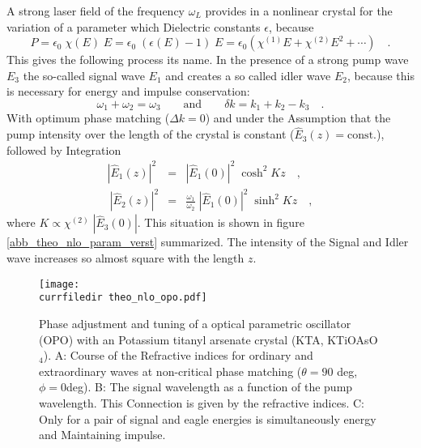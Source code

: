 A strong laser field of the frequency $\omega_L$ provides in a
nonlinear crystal for the variation of a parameter which
Dielectric constants $\epsilon$, because \cite{kroll62}
\begin{equation}
  P = \epsilon_0 \; \chi(E) \; E = \epsilon_0 \;(\epsilon(E) -1)\; E = \epsilon_0
  \left( \chi^{(1)} E + \chi^{(2)} E^2 + \cdots \right) \quad .
\end{equation}
This gives the following process its name. In the presence of a
strong pump wave $E_3$ the so-called signal wave $E_1$
and creates a so called idler wave $E_2$, because this
is necessary for energy and impulse conservation:
\begin{equation}
   \omega_1 + \omega_2 = \omega_3 \qquad \text{and} \qquad \delta
   k = k_1 + k_2 - k_3 \quad .
\end{equation}
With optimum phase matching ($\Delta k = 0$) and under the
Assumption that the pump intensity over the length of the crystal
is constant ($\hat{E}_3(z) = \text{const.}$), followed by
Integration
\begin{eqnarray}
  \left| \hat{E}_1(z) \right|^2 & = & \left| \hat{E}_1(0)
  \right|^2 \; \cosh^2 K z \quad ,\\\
    \left| \hat{E}_2(z) \right|^2 & = & \frac{\omega_1}{\omega_2} \; \left| \hat{E}_1(0)
  \right|^2 \; \sinh^2 K z \quad,
\end{eqnarray}
where $K \propto \chi^{(2)} \; \left| \hat{E}_3(0) \right|$.
This situation is shown in figure \ref{abb_theo_nlo_param_verst}
summarized. The intensity of the Signal and Idler wave increases
so almost square with the length $z$.


\begin{figure}[b]
\center
\texttt{[image: \\currfiledir  theo\_nlo\_opo.pdf]}
\caption{Phase adjustment and tuning of a
optical parametric oscillator (OPO) with an
Potassium titanyl arsenate crystal (KTA, KTiOAsO$_4$). A: Course of the
Refractive indices for ordinary and extraordinary waves at
non-critical phase matching ($\theta = 90$ deg, $\phi = 0$deg). B:
The signal wavelength as a function of the pump wavelength. This
Connection is given by the refractive indices. C: Only for a
pair of signal and eagle energies is simultaneously energy and
Maintaining impulse. } \label{abb_theo_nlo_opo}
\end{figure}

